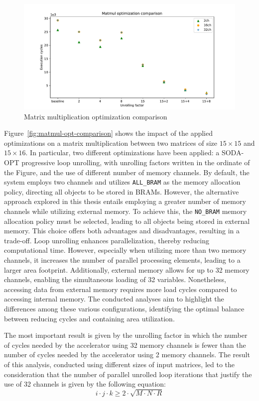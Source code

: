 \documentclass[11pt,a4paper,twocolumn]{article}
\begin{document}
\begin{figure}[t]
    \centering
    \includegraphics[height=0.24\textwidth]{Images/matmul_comparison15}
    \caption{Matrix multiplication optimization comparison}
    \label{fig:matmul-opts-comparison}
\end{figure}

Figure~\ref{fig:matmul-opt-comparison} shows the impact of the applied optimizations on a matrix multiplication between two matrices of size $15 \times 15$ and $15 \times 16$.
In particular, two different optimizations have been applied: a SODA-OPT progressive loop unrolling, with unrolling factors written in the ordinate of the Figure, and the use of different number of memory channels.
By default, the system employs two channels and utilizes \lstinline{ALL_BRAM} as the memory allocation policy, directing all objects to be stored in BRAMs.
However, the alternative approach explored in this thesis entails employing a greater number of memory channels while utilizing external memory.
To achieve this, the \lstinline{NO_BRAM} memory allocation policy must be selected, leading to all objects being stored in external memory.
This choice offers both advantages and disadvantages, resulting in a trade-off.
Loop unrolling enhances parallelization, thereby reducing computational time.
However, especially when utilizing more than two memory channels, it increases the number of parallel processing elements, leading to a larger area footprint.
Additionally, external memory allows for up to 32 memory channels, enabling the simultaneous loading of 32 variables.
Nonetheless, accessing data from external memory requires more load cycles compared to accessing internal memory.
The conducted analyses aim to highlight the differences among these various configurations, identifying the optimal balance between reducing cycles and containing area utilization.

The most important result is given by the unrolling factor in which the number of cycles needed by the accelerator using 32 memory channels is fewer than the number of cycles needed by the accelerator using 2 memory channels.
The result of this analysis, conducted using different sizes of input matrices, led to the consideration that the number of parallel unrolled loop iterations that justify the use of 32 channels is given by the following equation:
\begin{equation}
    \label{eq:factor-relation}
        i \cdot j \cdot k \geq 2 \cdot \sqrt {M \cdot N \cdot R}
\end{equation}
\end{document}
